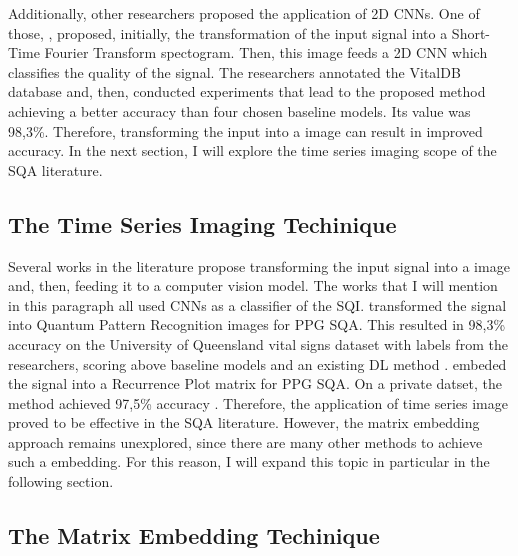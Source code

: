 Additionally, other researchers proposed the application of 2D \acrshort{CNN}s. One of those, \citeauthor{review-12}, proposed, initially, the transformation of the input signal into a Short-Time Fourier Transform spectogram. Then, this image feeds a 2D \acrshort{CNN} which classifies the quality of the signal. The researchers annotated the VitalDB database and, then, conducted experiments that lead to the proposed method achieving a better accuracy than four chosen baseline models. Its value was 98,3\%. Therefore, transforming the input into a image can result in improved accuracy. In the next section, I will explore the time series imaging scope of the \acrshort{SQA} literature.


\subsection{The Time Series Imaging Techinique}
\label{sec:imaging}

Several works in the literature propose transforming the input signal into a image and, then, feeding it to a computer vision model. The works that I will mention in this paragraph all used \acrshort{CNN}s as a classifier of the \acrshort{SQI}. \citeauthor{review-13} transformed the signal into Quantum Pattern Recognition images for PPG \acrshort{SQA}. This resulted in 98,3\% accuracy on the University of Queensland vital signs dataset with labels from the researchers, scoring above baseline models and an existing \acrshort{DL} method \cite{review-13}. \citeauthor{review-15} embeded the signal into a Recurrence Plot matrix for PPG \acrshort{SQA}. On a private datset, the method achieved 97,5\% accuracy \cite{review-15}. Therefore, the application of time series image proved to be effective in the \acrshort{SQA} literature. However, the matrix embedding approach remains unexplored, since there are many other methods to achieve such a embedding. For this reason, I will expand this topic in particular in the following section.  

\subsection{The Matrix Embedding Techinique}
\label{sec:matrix}

